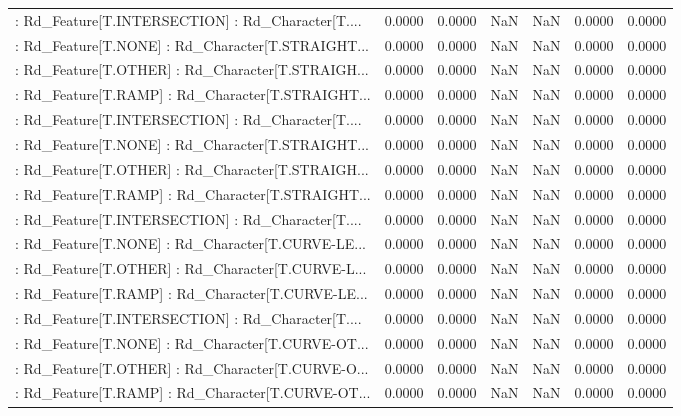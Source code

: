 \begin{longtable}{p{4cm}cccccc}
 : Rd\_Feature[T.INTERSECTION] : Rd\_Character[T.... &  0.0000 &    0.0000 &     NaN &          NaN &  0.0000 &  0.0000 \\
 : Rd\_Feature[T.NONE] : Rd\_Character[T.STRAIGHT... &  0.0000 &    0.0000 &     NaN &          NaN &  0.0000 &  0.0000 \\
 : Rd\_Feature[T.OTHER] : Rd\_Character[T.STRAIGH... &  0.0000 &    0.0000 &     NaN &          NaN &  0.0000 &  0.0000 \\
 : Rd\_Feature[T.RAMP] : Rd\_Character[T.STRAIGHT... &  0.0000 &    0.0000 &     NaN &          NaN &  0.0000 &  0.0000 \\
 : Rd\_Feature[T.INTERSECTION] : Rd\_Character[T.... &  0.0000 &    0.0000 &     NaN &          NaN &  0.0000 &  0.0000 \\
 : Rd\_Feature[T.NONE] : Rd\_Character[T.STRAIGHT... &  0.0000 &    0.0000 &     NaN &          NaN &  0.0000 &  0.0000 \\
 : Rd\_Feature[T.OTHER] : Rd\_Character[T.STRAIGH... &  0.0000 &    0.0000 &     NaN &          NaN &  0.0000 &  0.0000 \\
 : Rd\_Feature[T.RAMP] : Rd\_Character[T.STRAIGHT... &  0.0000 &    0.0000 &     NaN &          NaN &  0.0000 &  0.0000 \\
 : Rd\_Feature[T.INTERSECTION] : Rd\_Character[T.... &  0.0000 &    0.0000 &     NaN &          NaN &  0.0000 &  0.0000 \\
 : Rd\_Feature[T.NONE] : Rd\_Character[T.CURVE-LE... &  0.0000 &    0.0000 &     NaN &          NaN &  0.0000 &  0.0000 \\
 : Rd\_Feature[T.OTHER] : Rd\_Character[T.CURVE-L... &  0.0000 &    0.0000 &     NaN &          NaN &  0.0000 &  0.0000 \\
 : Rd\_Feature[T.RAMP] : Rd\_Character[T.CURVE-LE... &  0.0000 &    0.0000 &     NaN &          NaN &  0.0000 &  0.0000 \\
 : Rd\_Feature[T.INTERSECTION] : Rd\_Character[T.... &  0.0000 &    0.0000 &     NaN &          NaN &  0.0000 &  0.0000 \\
 : Rd\_Feature[T.NONE] : Rd\_Character[T.CURVE-OT... &  0.0000 &    0.0000 &     NaN &          NaN &  0.0000 &  0.0000 \\
 : Rd\_Feature[T.OTHER] : Rd\_Character[T.CURVE-O... &  0.0000 &    0.0000 &     NaN &          NaN &  0.0000 &  0.0000 \\
 : Rd\_Feature[T.RAMP] : Rd\_Character[T.CURVE-OT... &  0.0000 &    0.0000 &     NaN &          NaN &  0.0000 &  0.0000 \\

\end{longtable}
